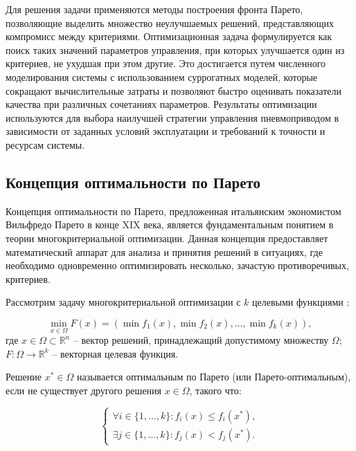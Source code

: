 Для решения задачи применяются методы построения фронта Парето,
позволяющие выделить множество неулучшаемых решений, представляющих
компромисс между критериями. Оптимизационная задача формулируется как
поиск таких значений параметров управления, при которых улучшается
один из критериев, не ухудшая при этом другие. Это достигается путем
численного моделирования системы с использованием суррогатных моделей,
которые сокращают вычислительные затраты и позволяют быстро оценивать
показатели качества при различных сочетаниях параметров. Результаты
оптимизации используются для выбора наилучшей стратегии управления
пневмоприводом в зависимости от заданных условий эксплуатации и
требований к точности и ресурсам системы.

\subsection{Концепция оптимальности по Парето}\label{ch:ch4/sec2/subsec1}

Концепция оптимальности по Парето, предложенная итальянским экономистом
Вильфредо Парето \cite*{pareto1896cours} в конце XIX века, является фундаментальным понятием в теории
многокритериальной оптимизации. Данная концепция предоставляет математический аппарат для
анализа и принятия решений \cite*{miettinen1999nonlinear} в ситуациях, где необходимо одновременно оптимизировать несколько,
зачастую противоречивых, критериев.

Рассмотрим задачу многокритериальной оптимизации с $k$ целевыми функциями \cite*{deb2001multi}:

\begin{equation}
    \label{eq:multiobjective_optimization}
    \min_{x \in \Omega} F(x) = (\min f_1(x), \min f_2(x), \ldots, \min f_k(x)),
\end{equation}
где $x \in \Omega \subset \mathbb{R}^n$ -- вектор решений, принадлежащий допустимому множеству $\Omega$;
$F: \Omega \rightarrow \mathbb{R}^k$ -- векторная целевая функция.

Решение $x^* \in \Omega$ называется оптимальным по Парето
(или Парето-оптимальным), если не существует другого решения $x \in \Omega$, такого что:

\begin{equation*}
    \begin{cases}
        \forall i \in \{1, \ldots, k\}: f_i(x) \leq f_i(x^*), \\
        \exists j \in \{1, \ldots, k\}: f_j(x) < f_j(x^*).
    \end{cases}
\end{equation*}

